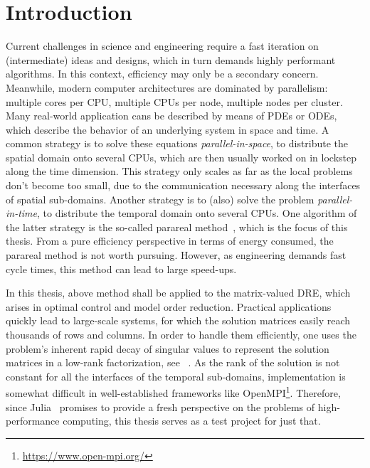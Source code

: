 \chapter{Introduction}

Current challenges in science and engineering require a fast iteration on (intermediate) ideas and designs,
which in turn demands highly performant algorithms.
In this context, efficiency may only be a secondary concern.
Meanwhile, modern computer architectures are dominated by parallelism:
multiple cores per CPU,
multiple CPUs per node,
multiple nodes per cluster.
Many real-world application cans be described by means of \acp{PDE} or \acp{ODE},
which describe the behavior of an underlying system in space and time.
A common strategy is to solve these equations \emph{parallel-in-space},
\ie to distribute the spatial domain onto several CPUs,
which are then usually worked on in lockstep along the time dimension.
This strategy only scales as far as the local problems don't become too small,
due to the communication necessary along the interfaces of spatial sub-domains.
Another strategy is to (also) solve the problem \emph{parallel-in-time},
\ie to distribute the temporal domain onto several CPUs.
One algorithm of the latter strategy is the so-called parareal method~\cite{Lions2001},
which is the focus of this thesis.
From a pure efficiency perspective in terms of energy consumed,
the parareal method is not worth pursuing.
However, as engineering demands fast cycle times,
this method can lead to large speed-ups.

In this thesis, above method shall be applied to the matrix-valued \ac{DRE},
which arises \eg in optimal control and model order reduction.
Practical applications quickly lead to large-scale systems,
for which the solution matrices easily reach thousands of rows and columns.
In order to handle them efficiently,
one uses the problem's inherent rapid decay of singular values
to represent the solution matrices in a low-rank factorization, see \eg~\cite{Penzl2000,Kuerschner2016,Lang2017}.
As the rank of the solution is not constant for all the interfaces of the temporal sub-domains,
implementation is somewhat difficult in well-established frameworks like OpenMPI\footnote{%
  \url{https://www.open-mpi.org/}
}.
Therefore, since Julia~\cite{Julia} promises to provide a fresh perspective on the problems of high-performance computing,
this thesis serves as a test project for just that.

